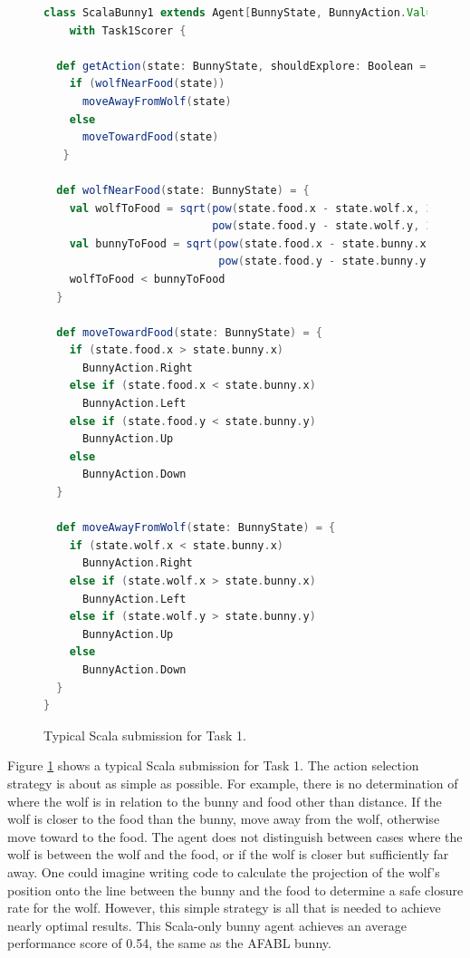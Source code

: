 \begin{figure}[!h]
\begin{center}

\begin{lstlisting}[language=Scala]
class ScalaBunny1 extends Agent[BunnyState, BunnyAction.Value]
    with Task1Scorer {

  def getAction(state: BunnyState, shouldExplore: Boolean = false) = {
    if (wolfNearFood(state))
      moveAwayFromWolf(state)
    else
      moveTowardFood(state)
   }

  def wolfNearFood(state: BunnyState) = {
    val wolfToFood = sqrt(pow(state.food.x - state.wolf.x, 2) +
                          pow(state.food.y - state.wolf.y, 2))
    val bunnyToFood = sqrt(pow(state.food.x - state.bunny.x, 2) +
                           pow(state.food.y - state.bunny.y, 2))
    wolfToFood < bunnyToFood
  }

  def moveTowardFood(state: BunnyState) = {
    if (state.food.x > state.bunny.x)
      BunnyAction.Right
    else if (state.food.x < state.bunny.x)
      BunnyAction.Left
    else if (state.food.y < state.bunny.y)
      BunnyAction.Up
    else
      BunnyAction.Down
  }

  def moveAwayFromWolf(state: BunnyState) = {
    if (state.wolf.x < state.bunny.x)
      BunnyAction.Right
    else if (state.wolf.x > state.bunny.x)
      BunnyAction.Left
    else if (state.wolf.y > state.bunny.y)
      BunnyAction.Up
    else
      BunnyAction.Down
  }
}
\end{lstlisting}

\caption{Typical Scala submission for Task 1.}
\end{center}
\label{fig:scala-task1-submission}
\end{figure}

Figure \ref{fig:scala-task1-submission} shows a typical Scala submission for Task 1. The action selection strategy is about as simple as possible. For example, there is no determination of where the wolf is in relation to the bunny and food other than distance. If the wolf is closer to the food than the bunny, move away from the wolf, otherwise move toward to the food. The agent does not distinguish between cases where the wolf is between the wolf and the food, or if the wolf is closer but sufficiently far away. One could imagine writing code to calculate the projection of the wolf's position onto the line between the bunny and the food to determine a safe closure rate for the wolf. However, this simple strategy is all that is needed to achieve nearly optimal results. This Scala-only bunny agent achieves an average performance score of 0.54, the same as the AFABL bunny.

